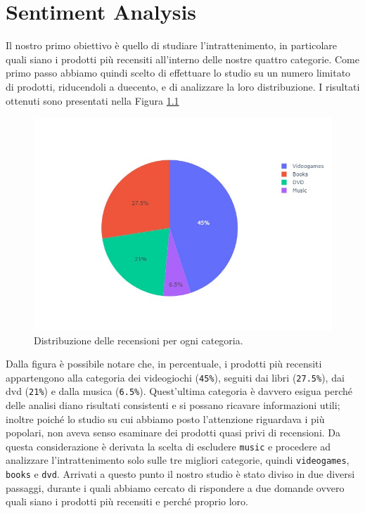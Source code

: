 \chapter{Sentiment Analysis}
	Il nostro primo obiettivo è quello di studiare l'intrattenimento, in particolare quali siano i prodotti più recensiti all'interno delle nostre quattro categorie. Come primo passo abbiamo  quindi scelto di effettuare lo studio su un numero limitato di prodotti, riducendoli a duecento, e di analizzare la loro distribuzione. I risultati ottenuti sono presentati nella Figura \ref{fig:pie_category}
		
	\begin{figure} [h]
		\includegraphics[width=\textwidth]{Figure/pie_category}	
		\caption{Distribuzione delle recensioni per ogni categoria.}
		\label{fig:pie_category}
	\end{figure}
	
	Dalla figura è possibile notare che, in percentuale, i prodotti più recensiti appartengono alla categoria dei videogiochi (\verb|45%|), seguiti dai libri (\verb|27.5%|), dai dvd (\verb|21%|) e dalla musica (\verb|6.5%|). Quest'ultima categoria è davvero esigua perché delle analisi diano risultati consistenti e si possano ricavare informazioni utili; inoltre poiché lo studio su cui abbiamo posto l'attenzione riguardava i più popolari, non aveva senso esaminare dei prodotti quasi privi di recensioni. Da questa considerazione è derivata la scelta di escludere \verb|music| e procedere ad analizzare l'intrattenimento solo sulle tre migliori categorie, quindi \verb|videogames|, \verb|books| e \verb|dvd|. Arrivati a questo punto il nostro studio è stato diviso in due diversi passaggi, durante i quali abbiamo cercato di rispondere a due domande ovvero quali siano i prodotti più recensiti e perché proprio loro. 
		
